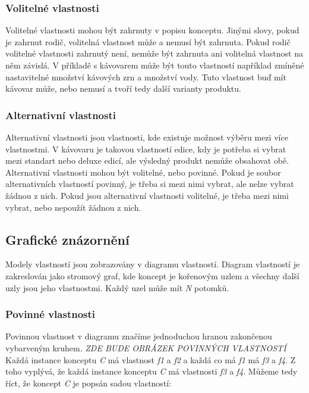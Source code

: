\subsubsection{Volitelné vlastnosti}
Volitelné vlastnosti mohou být zahrnuty v popisu konceptu. Jinými slovy, pokud je zahrnut rodič, volitelná vlastnost může a nemusí být zahrnuta. Pokud rodič volitelné vlastnosti zahrnutý není, nemůže být zahrnuta ani volitelná vlastnost na něm závislá. V příkladě s kávovarem může být touto vlastností například zmíněné nastavitelné množství kávových zrn a množství vody. Tuto vlastnost buď mít kávovar může, nebo nemusí a tvoří tedy další varianty produktu.

\subsubsection{Alternativní vlastnosti}
Alternativní vlastnosti jsou vlastnosti, kde existuje možnost výběru mezi více vlastnostmi. V kávovaru je takovou vlastností edice, kdy je potřeba si vybrat mezi standart nebo deluxe edicí, ale výsledný produkt nemůže obsahovat obě. Alternativní vlastnosti mohou být volitelné, nebo povinné. Pokud je soubor alternativních vlastností povinný, je třeba si mezi nimi vybrat, ale nelze vybrat žádnou z nich. Pokud jsou alternativní vlastnosti volitelné, je třeba mezi nimi vybrat, nebo nepoužít žádnou z nich.

\subsection{Grafické znázornění}
Modely vlastností jsou zobrazovány v diagramu vlastností. Diagram vlastností je zakreslován jako stromový graf, kde koncept je kořenovým uzlem a všechny další uzly jsou jeho vlastnostmi. Každý uzel může mít \textit{N} potomků.

\subsubsection{Povinné vlastnosti}
Povinnou vlastnost v diagramu značíme jednoduchou hranou zakončenou vybarveným kruhem.
\newline
\newline
\textit{ZDE BUDE OBRÁZEK POVINNÝCH VLASTNOSTÍ}
\newline
\newline
Každá instance konceptu \textit{C} má vlastnost \textit{f1} a \textit{f2} a každá co má \textit{f1} má \textit{f3} a \textit{f4}. Z toho vyplývá, že každá instance konceptu \textit{C} má vlastnosti \textit{f3} a \textit{f4}. Můžeme tedy říct, že koncept \textit{C} je popsán sadou vlastností:

